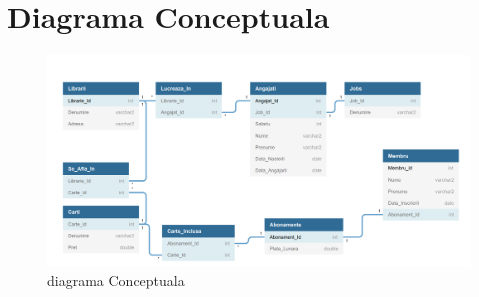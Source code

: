 \documentclass[12pt]{article}
\begin{document}
\section{Diagrama Conceptuala}
\begin{figure}[!htb]
	\includegraphics[max width=\linewidth]{imgs/diagConceptuala.png}
	\caption{diagrama Conceptuala}
	\label{fig:Conceptuala}
\end{figure}
\end{document}
